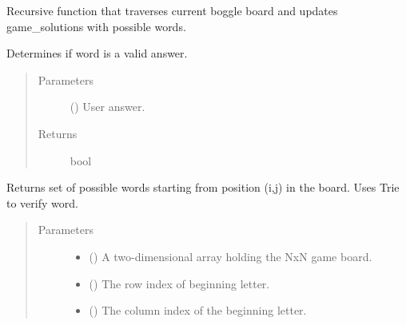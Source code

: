 \documentclass[letterpaper,10pt,english]{sphinxmanual}
\begin{document}
\begin{fulllineitems}
\begin{fulllineitems}
\end{fulllineitems}



\begin{fulllineitems}
Recursive function that traverses current boggle board and
updates game\_solutions with possible words.

\end{fulllineitems}



\begin{fulllineitems}
Determines if word is a valid answer.
\begin{quote}\begin{description}
\item[{Parameters}] \leavevmode
{} () \textendash{} User answer.

\item[{Returns}] \leavevmode
bool

\end{description}\end{quote}

\end{fulllineitems}



\begin{fulllineitems}
Returns set of possible words starting from position (i,j) in the board.
Uses Trie to verify word.
\begin{quote}\begin{description}
\item[{Parameters}] \leavevmode\begin{itemize}
\item {} 
 () \textendash{} A two-dimensional array holding the NxN game board.

\item {} 
 () \textendash{} The row index of beginning letter.

\item {} 
 () \textendash{} The column index of the beginning letter.


\end{itemize}
\end{description}
\end{quote}
\end{fulllineitems}
\end{fulllineitems}
\end{document}
